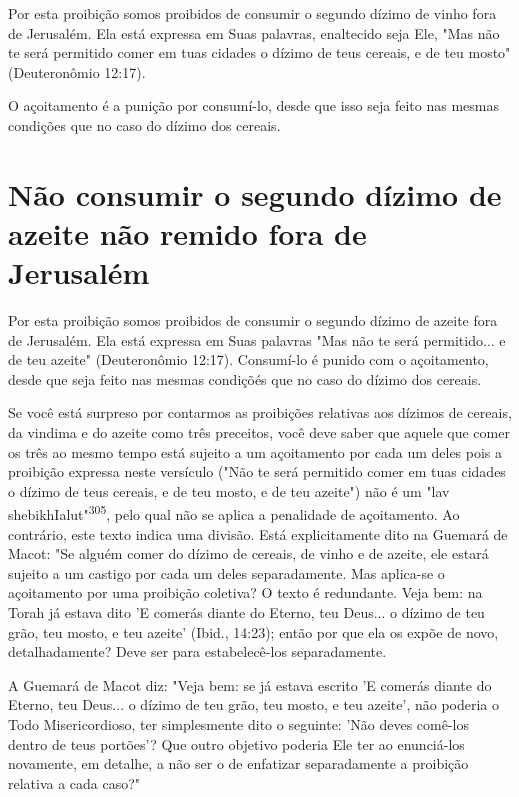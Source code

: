 Por esta proibição somos proibidos de consumir o segundo dízimo de vinho
fora de Jerusalém. Ela está expressa em Suas palavras, enaltecido seja
Ele, "Mas não te será permitido comer em tuas cidades o dízimo de teus
ce­reais, e de teu mosto" (Deuteronômio 12:17).

O açoitamento é a punição por consumí-lo, desde que isso seja feito nas
mesmas condições que no caso do dízimo dos cereais.

\section{Não consumir o segundo dízimo de azeite não remido fora de Jerusalém}

Por esta proibição somos proibidos de consumir o segundo dízimo de
azeite fora de Jerusalém. Ela está expressa em Suas palavras "Mas não te
será permitido... e de teu azeite" (Deuteronômio 12:17). Consumí-lo é
punido com o açoitamento, desde que seja feito nas mesmas condiçõés que
no caso do dízi­mo dos cereais.

Se você está surpreso por contarmos as proibições relativas aos dízi­mos
de cereais, da vindima e do azeite como três preceitos, você deve saber
que aquele que comer os três ao mesmo tempo está sujeito a um
açoitamento por cada um deles pois a proibição expressa neste versículo
("Não te será permi­tido comer em tuas cidades o dízimo de teus cereais,
e de teu mosto, e de teu azeite") não é um "lav
shebikhIalut"\textsuperscript{305}, pelo qual não se aplica a penalidade
de açoitamento. Ao contrário, este texto indica uma divisão. Está
explicitamente dito na Guemará de Macot: "Se alguém comer do dízimo de
cereais, de vinho e de azeite, ele estará sujeito a um castigo por cada
um deles separadamente. Mas aplica-se o açoitamento por uma proibição
coletiva? O texto é redundante. Veja bem: na Torah já estava dito 'E
comerás diante do Eterno, teu Deus... o dízimo de teu grão, teu mosto, e
teu azeite' (Ibid., 14:23); então por que ela os expõe de novo,
detalhadamente? Deve ser para estabelecê-los separadamente.

A Guemará de Macot diz: "Veja bem: se já estava escrito 'E comerás
diante do Eterno, teu Deus... o dízimo de teu grão, teu mosto, e teu
azeite', não poderia o Todo Misericordioso, ter simplesmente dito o
seguinte: 'Não de­ves comê-los dentro de teus portões'? Que outro
objetivo poderia Ele ter ao enunciá-los novamente, em detalhe, a não ser
o de enfatizar separadamente a proibição relativa a cada caso?"

